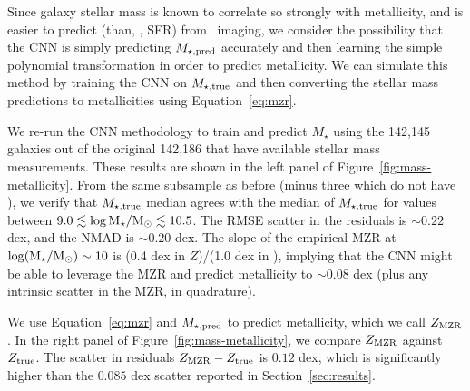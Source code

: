 \documentclass[fleqn,usenatbib]{mnras}
\begin{document}
Since galaxy stellar mass is known to correlate so strongly with metallicity, and is easier to predict (than, \eg, SFR) from \sdssi\sdssr\sdssg\ imaging, we consider the possibility that the CNN is simply predicting $M_{\star,\rm pred}$ accurately and then learning the simple polynomial transformation in order to predict metallicity. We can simulate this method by training the CNN on $M_{\star, \rm true}$ and then converting the stellar mass predictions to metallicities using Equation~\ref{eq:mzr}.

We re-run the CNN methodology to train and predict $M_{\star}$ using the 142,145 galaxies out of the original 142,186 that have available stellar mass measurements. These results are shown in the left panel of Figure~\ref{fig:mass-metallicity}. From the same subsample as before (minus three which do not have \mstar), we verify that $M_{\rm \star, true}$ median agrees with the median of $M_{\rm \star, true}$ for values between $9.0 \lesssim \log \hbox{M$_{\star}$} /\hbox{$\mathrm{M}_\odot$} \lesssim 10.5$. The RMSE scatter in the \mstar residuals is $\sim 0.22$ dex, and the NMAD is $\sim 0.20$ dex. The slope of the empirical MZR at $\log (\hbox{M$_{\star}$} / \hbox{$\mathrm{M}_\odot$}) \sim 10$ is (0.4 dex in $Z$)/(1.0 dex in \mstar), implying that the CNN might be able to leverage the MZR and predict metallicity to $\sim 0.08$ dex (plus any intrinsic scatter in the MZR, in quadrature).


We use Equation~\ref{eq:mzr} and $M_{\star,\rm pred}$ to predict metallicity, which we call $Z_{\rm MZR}$.
In the right panel of Figure~\ref{fig:mass-metallicity}, we compare $Z_{\rm MZR}$ against $Z_{\rm true}$.
The scatter in residuals $Z_{\rm MZR} - Z_{\rm true}$ is $0.12$ dex, which is significantly higher than the $0.085$ dex scatter reported in Section~\ref{sec:results}.
\end{document}
